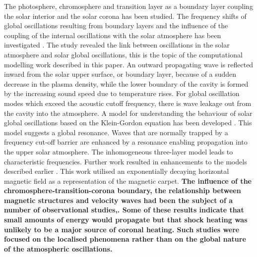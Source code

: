 \documentclass[physics,article,submit,pdftex,moreauthors]{Definitions/mdpi}
\begin{document}
 The photosphere, chromosphere and transition layer as a boundary layer coupling the solar interior and the solar corona has been studied. The frequency shifts of global oscillations resulting  from boundary layers   and the influence of the coupling of the internal oscillations with the solar atmosphere has been investigated \cite{Erdelyi2006}.  The study revealed the link between oscillations in the solar atmosphere and solar global oscillations,  this is the topic of the computational modelling work described in this paper. An outward propagating wave is reflected inward from the solar upper surface, or boundary layer, because of a sudden decrease in the plasma density, while the lower boundary of the cavity is formed by the increasing sound speed due to temperature rises. For global oscillation modes which exceed the acoustic cutoff frequency, there is wave leakage out from the cavity into the atmosphere. A model for understanding the behaviour of solar global oscillations based on the Klein-Gordon equation has been  developed \cite{Taroyan2008}. This model suggests a global resonance. Waves  that are normally trapped by a frequency cut-off barrier are enhanced by a resonance enabling propagation into the upper solar atmosphere. The inhomogeneous three-layer model leads to characteristic frequencies. Further work resulted in enhancements to the models described earlier \cite{Pinter2007}.  This work utilised an exponentially decaying horizontal magnetic field as a representation of the magnetic carpet. {\bf The influence of the chromosphere-transition-corona boundary, the relationship between magnetic structures and velocity waves had been the subject of a number of observational studies\cite{Mein1976},\cite{Schmieder1980}. Some of these results indicate that small amounts of energy would propagate but that shock heating was unlikely to be a major source of coronal heating. Such studies were focused on the localised phenomena rather than on the global nature of the atmospheric oscillations.  }
 
\end{document}
